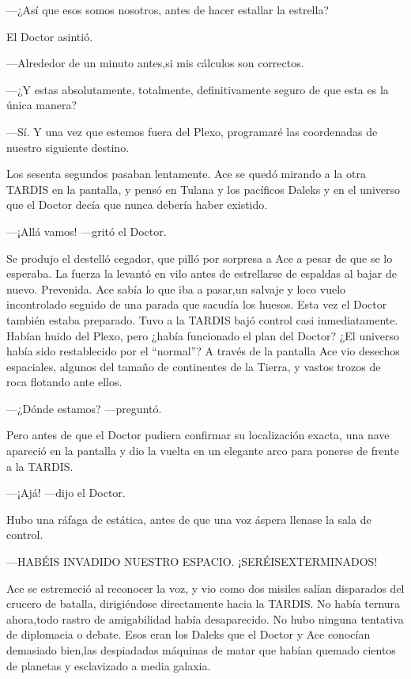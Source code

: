 ---¿Así que esos somos nosotros, antes de hacer estallar la
estrella?

El Doctor asintió.

---Alrededor de un minuto antes,si mis cálculos son correctos.

---¿Y estas absolutamente, totalmente, definitivamente seguro de
que esta es la única manera?

---Sí. Y una vez que estemos fuera del Plexo, programaré las
coordenadas de nuestro siguiente destino.

Los sesenta segundos pasaban lentamente. Ace se quedó mirando a
la otra TARDIS en la pantalla, y pensó en Tulana y los pacíficos Daleks
y en el universo que el Doctor decía que nunca debería haber existido.

---¡Allá vamos! ---gritó el Doctor.

Se produjo el destelló cegador, que pilló por sorpresa a Ace a
pesar de que se lo esperaba. La fuerza la levantó en vilo antes de
estrellarse de espaldas al bajar de nuevo. Prevenida. Ace sabía lo que
iba a pasar,un salvaje y loco vuelo incontrolado seguido de una parada
que sacudía los huesos. Esta vez el Doctor también estaba preparado.
Tuvo a la TARDIS bajó control casi inmediatamente. Habían huido del
Plexo, pero ¿había funcionado el plan del Doctor? ¿El universo había
sido restablecido por el ``normal''? A través de la pantalla Ace vio
desechos espaciales, algunos del tamaño de continentes de la Tierra, y
vastos trozos de roca flotando ante ellos.

---¿Dónde estamos? ---preguntó.

Pero antes de que el Doctor pudiera confirmar su localización
exacta, una nave apareció en la pantalla y dio la vuelta en un elegante
arco para ponerse de frente a la TARDIS.

---¡Ajá! ---dijo el Doctor.

Hubo una ráfaga de estática, antes de que una voz áspera llenase
la sala de control.

---HABÉIS INVADIDO NUESTRO ESPACIO. ¡SERÉISEXTERMINADOS!

Ace se estremeció al reconocer la voz, y vio como dos misiles
salían disparados del crucero de batalla, dirigiéndose directamente
hacia la TARDIS. No había ternura ahora,todo rastro de amigabilidad
había desaparecido. No hubo ninguna tentativa de diplomacia o debate.
Esos eran los Daleks que el Doctor y Ace conocían demasiado bien,las
despiadadas máquinas de matar que habían quemado cientos de planetas y
esclavizado a media galaxia.

